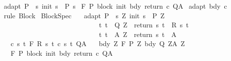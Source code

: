 \begin{isabellebody}
\ adapt{\isacharcolon}\ {\isachardoublequoteopen}P\ {\isasymsubseteq}\ {\isacharbraceleft}s{\isachardot}\ init\ s\ {\isasymin}\ P{\isacharprime}\ s{\isacharbraceright}{\isachardoublequoteclose}\isanewline
{}\ {\isachardoublequoteopen}{\isasymGamma}{\isacharcomma}{\isasymTheta}{\isasymturnstile}\isactrlbsub {\isacharslash}F\isactrlesub \ P\ {\isacharparenleft}block\ init\ bdy\ return\ c{\isacharparenright}\ Q{\isacharcomma}A{\isachardoublequoteclose}\isanewline
%
\isadelimproof
%
\endisadelimproof
%
\isatagproof
{}\isamarkupfalse%
\ adapt\ bdy\ c\ \ \isanewline
\ \ \isamarkupfalse%
\ {\isacharparenleft}rule\ Block{\isacharparenright}%
\endisatagproof
{\isafoldproof}%
%
\isadelimproof
\isanewline
%
\endisadelimproof
\isanewline
\isanewline
{}\isamarkupfalse%
\ BlockSpec{\isacharcolon}\isanewline
\ \ \ adapt{\isacharcolon}\ {\isachardoublequoteopen}P\ {\isasymsubseteq}\ {\isacharbraceleft}s{\isachardot}\ {\isasymexists}Z{\isachardot}\ init\ s\ {\isasymin}\ P{\isacharprime}\ Z\ {\isasymand}\ \isanewline
\ \ \ \ \ \ \ \ \ \ \ \ \ \ \ \ \ \ \ \ \ \ \ \ \ \ \ \ \ {\isacharparenleft}{\isasymforall}t{\isachardot}\ t\ {\isasymin}\ Q{\isacharprime}\ Z\ {\isasymlongrightarrow}\ return\ s\ t\ {\isasymin}\ R\ s\ t{\isacharparenright}\ {\isasymand}\isanewline
\ \ \ \ \ \ \ \ \ \ \ \ \ \ \ \ \ \ \ \ \ \ \ \ \ \ \ \ \ {\isacharparenleft}{\isasymforall}t{\isachardot}\ t\ {\isasymin}\ A{\isacharprime}\ Z\ {\isasymlongrightarrow}\ return\ s\ t\ {\isasymin}\ A{\isacharparenright}{\isacharbraceright}{\isachardoublequoteclose}\isanewline
\ \ \ c{\isacharcolon}\ {\isachardoublequoteopen}{\isasymforall}s\ t{\isachardot}\ {\isasymGamma}{\isacharcomma}{\isasymTheta}{\isasymturnstile}\isactrlbsub {\isacharslash}F\isactrlesub \ {\isacharparenleft}R\ s\ t{\isacharparenright}\ {\isacharparenleft}c\ s\ t{\isacharparenright}\ Q{\isacharcomma}A{\isachardoublequoteclose}\isanewline
\ \ \ bdy{\isacharcolon}\ {\isachardoublequoteopen}{\isasymforall}Z{\isachardot}\ {\isasymGamma}{\isacharcomma}{\isasymTheta}{\isasymturnstile}\isactrlbsub {\isacharslash}F\isactrlesub \ {\isacharparenleft}P{\isacharprime}\ Z{\isacharparenright}\ bdy\ {\isacharparenleft}Q{\isacharprime}\ Z{\isacharparenright}{\isacharcomma}{\isacharparenleft}A{\isacharprime}\ Z{\isacharparenright}{\isachardoublequoteclose}\ \isanewline
\ \ \ {\isachardoublequoteopen}{\isasymGamma}{\isacharcomma}{\isasymTheta}{\isasymturnstile}\isactrlbsub {\isacharslash}F\isactrlesub \ P\ {\isacharparenleft}block\ init\ bdy\ return\ c{\isacharparenright}\ Q{\isacharcomma}A{\isachardoublequoteclose}\ \isanewline

\end{isabellebody}
